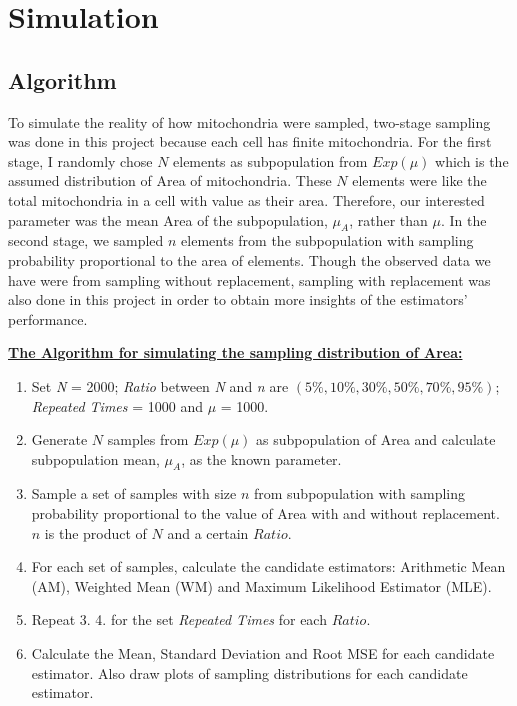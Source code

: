 \documentclass{article}\usepackage[]{graphicx}\usepackage[]{color}
\numberwithin{figure}{subsection} %
\numberwithin{table}{subsection} %
\begin{document}
\setcounter{section}{4} 
\setcounter{page}{18}


\section{Simulation}
\subsection{Algorithm}
To simulate the reality of how mitochondria were sampled, two-stage sampling was done in this project because each cell has finite mitochondria. For the first stage, I randomly chose $N$ elements as subpopulation from $Exp({\mu})$ which is the assumed distribution of Area of mitochondria. These $N$ elements were like the total mitochondria in a cell with value as their area. Therefore, our interested parameter was the mean Area of the subpopulation, ${\mu}_{A}$, rather than $\mu$. In the second stage, we sampled $n$ elements from the subpopulation with sampling probability proportional to the area of elements. Though the observed data we have were from sampling without replacement, sampling with replacement was also done in this project in order to obtain more insights of the estimators' performance.

\bigskip
\setlength{\parskip}{0em}
\noindent\textbf{\underline{The Algorithm for simulating the sampling distribution of Area:}}

\begin{enumerate}
  \item Set \textit{N} = 2000; \textit{Ratio} between \textit{N} and \textit{n} are $\left( 5\%, 10\%, 30\%, 50\%, 70\%, 95\% \right)$; \textit{Repeated Times} = 1000 and $\mu$ = 1000. 
  \item Generate $N$ samples from $Exp(\mu)$ as subpopulation of Area and calculate subpopulation mean, ${\mu}_{A}$, as the known parameter.
  \item Sample a set of samples with size $n$ from subpopulation with sampling probability proportional to the value of Area with and without replacement. $n$ is the product of $N$ and a certain $Ratio$.
  \item For each set of samples, calculate the candidate estimators: Arithmetic Mean (AM), Weighted Mean (WM) and Maximum Likelihood Estimator (MLE).
  \item Repeat 3. 4. for the set \textit{Repeated Times} for each $Ratio$. 
  \item Calculate the Mean, Standard Deviation and Root MSE for each candidate estimator. Also draw plots of sampling distributions for each candidate estimator.
\end{enumerate}
\end{document}
